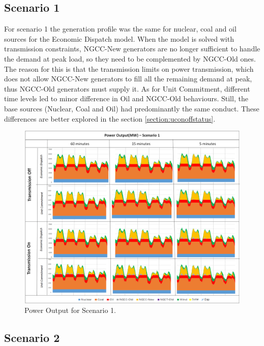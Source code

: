 \documentclass[12pt,LUDisStyle,twosided]{book}
\begin{document}
\subsection{Scenario 1}


For scenario 1 the generation profile was the same for nuclear, coal and oil sources for the Economic Dispatch model. When the model is solved with transmission constraints, NGCC-New generators are no longer sufficient to handle the demand at peak load, so they need to be complemented by NGCC-Old ones. The reason for this is that the transmission limits on power transmission, which does not allow NGCC-New generators to fill all the remaining demand at peak, thus NGCC-Old generators must supply it. As for Unit Commitment, different time levels led to minor difference in Oil and NGCC-Old behaviours. Still, the base sources (Nuclear, Coal and Oil) had predominantly the same conduct. These differences are better explored in the section \ref{section:uconoffstatus}.

\begin{figure}[H]
  \centering
	  \includegraphics[width=\textwidth,height=\textheight,keepaspectratio]{PowerOutputScenario1.png}
  \caption{Power Output for Scenario 1.}
  \label{fig:powerOutputScenario1}
\end{figure}


\subsection{Scenario 2}
\end{document}
